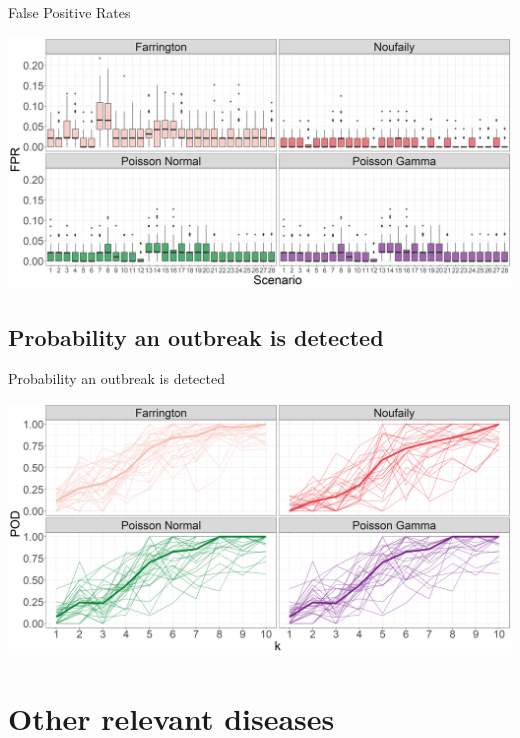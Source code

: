 \documentclass[aspectratio=169,handout]{beamer}
\begin{document}
\begin{frame}{False Positive Rates}
\tiny

\includegraphics[width=1\linewidth]{../../figures/FPRPlot}

\normalsize
\end{frame}

\hypertarget{probability-an-outbreak-is-detected}{%
\subsection{Probability an outbreak is
detected}\label{probability-an-outbreak-is-detected}}

\begin{frame}{Probability an outbreak is detected}
\tiny

\includegraphics[width=1\linewidth]{../../figures/PropDetect}

\normalsize
\end{frame}

\hypertarget{other-relevant-diseases}{%
\section{Other relevant diseases}\label{other-relevant-diseases}}
\end{document}
